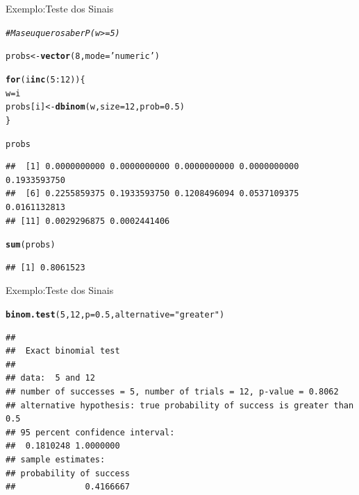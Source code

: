 \documentclass{beamer}\usepackage[]{graphicx}\usepackage[]{color}
\makeatletter
\newcommand{\hlnum}[1]{\textcolor[rgb]{0.686,0.059,0.569}{#1}}%
\newcommand{\hlstr}[1]{\textcolor[rgb]{0.192,0.494,0.8}{#1}}%
\newcommand{\hlcom}[1]{\textcolor[rgb]{0.678,0.584,0.686}{\textit{#1}}}%
\newcommand{\hlopt}[1]{\textcolor[rgb]{0,0,0}{#1}}%
\newcommand{\hlstd}[1]{\textcolor[rgb]{0.345,0.345,0.345}{#1}}%
\newcommand{\hlkwa}[1]{\textcolor[rgb]{0.161,0.373,0.58}{\textbf{#1}}}%
\newcommand{\hlkwb}[1]{\textcolor[rgb]{0.69,0.353,0.396}{#1}}%
\newcommand{\hlkwc}[1]{\textcolor[rgb]{0.333,0.667,0.333}{#1}}%
\newcommand{\hlkwd}[1]{\textcolor[rgb]{0.737,0.353,0.396}{\textbf{#1}}}%
\newenvironment{kframe}{%
 \def\at@end@of@kframe{}%
 \ifinner\ifhmode%
  \def\at@end@of@kframe{\end{minipage}}%
  \begin{minipage}{\columnwidth}%
 \fi\fi%
 \def\FrameCommand##1{\hskip\@totalleftmargin \hskip-\fboxsep
 \colorbox{shadecolor}{##1}\hskip-\fboxsep
     \hskip-\linewidth \hskip-\@totalleftmargin \hskip\columnwidth}%
 \MakeFramed {\advance\hsize-\width
   \@totalleftmargin\z@ \linewidth\hsize
   \@setminipage}}%
 {\par\unskip\endMakeFramed%
 \at@end@of@kframe}
\newenvironment{knitrout}{}{} %
\renewenvironment{knitrout}{\setlength{\topsep}{0mm}}{}
\makeatother
\begin{document}
  
\begin{frame}[fragile]{Exemplo:Teste dos Sinais}

\begin{knitrout}\tiny
{}\color{fgcolor}\begin{kframe}
\begin{alltt}
\hlcom{# Mas eu quero saber P(w >= 5)}

\hlstd{probs} \hlkwb{<-}\hlkwd{vector}\hlstd{(}\hlnum{8}\hlstd{,}\hlkwc{mode}\hlstd{=}\hlstr{'numeric'}\hlstd{)}

\hlkwa{for}\hlstd{(i} \hlkwa{in} \hlkwd{c}\hlstd{(}\hlnum{5}\hlopt{:}\hlnum{12}\hlstd{))\{}
  \hlstd{w}\hlkwb{=}\hlstd{i}
  \hlstd{probs[i]} \hlkwb{<-} \hlkwd{dbinom}\hlstd{(w,}\hlkwc{size}\hlstd{=}\hlnum{12}\hlstd{,}\hlkwc{prob}\hlstd{=}\hlnum{0.5}\hlstd{)}
\hlstd{\}}

\hlstd{probs}
\end{alltt}
\begin{verbatim}
##  [1] 0.0000000000 0.0000000000 0.0000000000 0.0000000000 0.1933593750
##  [6] 0.2255859375 0.1933593750 0.1208496094 0.0537109375 0.0161132813
## [11] 0.0029296875 0.0002441406
\end{verbatim}
\begin{alltt}
\hlkwd{sum}\hlstd{(probs)}
\end{alltt}
\begin{verbatim}
## [1] 0.8061523
\end{verbatim}
\end{kframe}
\end{knitrout}

\end{frame} 

\begin{frame}[fragile]{Exemplo:Teste dos Sinais}

\begin{knitrout}\tiny
{}\color{fgcolor}\begin{kframe}
\begin{alltt}
\hlkwd{binom.test}\hlstd{(}\hlnum{5}\hlstd{,}\hlnum{12}\hlstd{,}\hlkwc{p}\hlstd{=}\hlnum{0.5}\hlstd{,}\hlkwc{alternative}\hlstd{=}\hlstr{"greater"}\hlstd{)}
\end{alltt}
\begin{verbatim}
## 
## 	Exact binomial test
## 
## data:  5 and 12
## number of successes = 5, number of trials = 12, p-value = 0.8062
## alternative hypothesis: true probability of success is greater than 0.5
## 95 percent confidence interval:
##  0.1810248 1.0000000
## sample estimates:
## probability of success 
##              0.4166667
\end{verbatim}
\end{kframe}
\end{knitrout}

\end{frame} 
\end{document}

